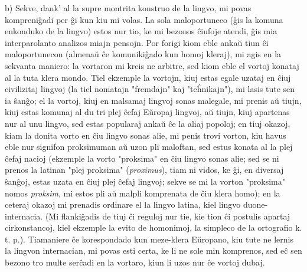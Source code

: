    b) Sekve, dank' al la supre montrita konstruo de la lingvo, mi povas
kompreni\^gadi per \^gi kun kiu mi volas. La sola maloportuneco
(\^gis la komuna enkonduko de la lingvo) estos nur tio, ke mi
bezonos \^ciufoje atendi, \^gis mia interparolanto analizos miajn
pensojn. Por forigi kiom eble anka\u u tiun \^ci maloportunecon
(almena\u u \^ce komuniki\^gado kun homoj kleraj), mi agis en la
sekvanta maniero: la vortaron mi kreis ne arbitre, sed kiom eble el
vortoj konataj al la tuta klera mondo. Tiel ekzemple la vortojn,
kiuj estas egale uzataj en \^ciuj civilizitaj lingvoj (la tiel
nomatajn "fremdajn" kaj "te\^hnikajn"), mi lasis tute sen ia
\^san\^go; el la vortoj, kiuj en malsamaj lingvoj sonas malegale, mi
prenis a\u u tiujn, kiuj estas komunaj al du tri plej \^cefaj E\u
uropaj lingvoj, a\u u tiujn, kiuj apartenas nur al unu lingvo, sed
estas popularaj anka\u u \^ce la aliaj popoloj; en tiuj okazoj, kiam
la donita vorto en \^ciu lingvo sonas alie, mi penis trovi vorton,
kiu havus eble nur signifon proksimuman a\u u uzon pli maloftan, sed
estus konata al la plej \^cefaj nacioj (ekzemple la vorto
"proksima" en \^ciu lingvo sonas alie; sed se ni prenos la latinan
"plej proksima" ({\sl proximus}), tiam ni vidos, ke \^gi, en
diversaj \^san\^goj, estas uzata en \^ciuj plej \^cefaj lingvoj;
sekve se mi la vorton "proksima" nomos {\sl proksim}, mi estos pli
a\u u malpli komprenata de \^ciu klera homo); en la ceteraj okazoj
mi prenadis ordinare el la lingvo latina, kiel lingvo
duone-internacia. (Mi flanki\^gadis de tiuj \^ci reguloj nur tie,
kie tion \^ci postulis apartaj cirkonstancoj, kiel ekzemple la evito
de homonimoj, la simpleco de la ortografio k. t. p.). Tiamaniere
\^ce korespondado kun meze-klera E\u uropano, kiu tute ne lernis la
lingvon internacian, mi povas esti certa, ke li ne sole min
komprenos, sed e\^c sen bezono tro multe ser\^cadi en la vortaro,
kiun li uzos nur \^ce vortoj dubaj.

\smallrule{}

